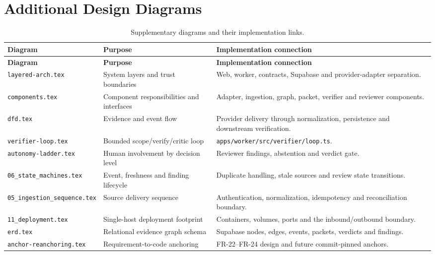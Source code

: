 \chapter{Additional Design Diagrams}\label{app:diagrams}

\begin{longtable}{>{\raggedright\arraybackslash}p{}>{\raggedright\arraybackslash}p{}>{\raggedright\arraybackslash}p{}}
\caption{Supplementary diagrams and their implementation links.}\label{tab:appendix-diagrams}\\
\toprule
\textbf{Diagram} & \textbf{Purpose} & \textbf{Implementation connection}\\
\midrule
\endfirsthead
\toprule
\textbf{Diagram} & \textbf{Purpose} & \textbf{Implementation connection}\\
\midrule
\endhead
\texttt{layered-arch.tex} & System layers and trust boundaries & Web, worker, contracts, Supabase and provider-adapter separation.\\
\texttt{components.tex} & Component responsibilities and interfaces & Adapter, ingestion, graph, packet, verifier and reviewer components.\\
\texttt{dfd.tex} & Evidence and event flow & Provider delivery through normalization, persistence and downstream verification.\\
\texttt{verifier-loop.tex} & Bounded scope/verify/critic loop & \texttt{apps/worker/src/verifier/loop.ts}.\\
\texttt{autonomy-ladder.tex} & Human involvement by decision level & Reviewer findings, abstention and verdict gate.\\
\texttt{06\_state\_machines.tex} & Event, freshness and finding lifecycle & Duplicate handling, stale sources and review state transitions.\\
\texttt{05\_ingestion\_sequence.tex} & Source delivery sequence & Authentication, normalization, idempotency and reconciliation boundary.\\
\texttt{11\_deployment.tex} & Single-host deployment footprint & Containers, volumes, ports and the inbound/outbound boundary.\\
\texttt{erd.tex} & Relational evidence graph schema & Supabase nodes, edges, events, packets, verdicts and findings.\\
\texttt{anchor-reanchoring.tex} & Requirement-to-code anchoring & FR-22--FR-24 design and future commit-pinned anchors.\\
\bottomrule
\end{longtable}

